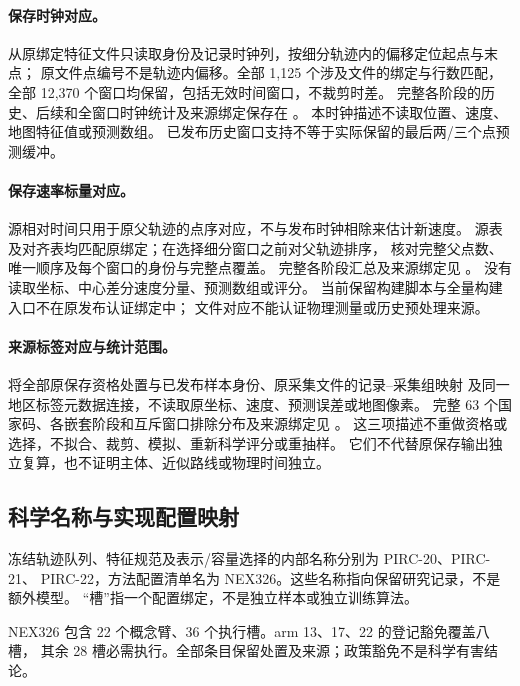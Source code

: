\documentclass[UTF8,11pt]{ctexart}
\begin{document}
\paragraph{保存时钟对应。}
从原绑定特征文件只读取身份及记录时钟列，按细分轨迹内的偏移定位起点与末点；
原文件点编号不是轨迹内偏移。全部 1,125 个涉及文件的绑定与行数匹配，
全部 12,370 个窗口均保留，包括无效时间窗口，不裁剪时差。
完整各阶段的历史、后续和全窗口时钟统计及来源绑定保存在
。
本时钟描述不读取位置、速度、地图特征值或预测数组。
已发布历史窗口支持不等于实际保留的最后两/三个点预测缓冲。

\paragraph{保存速率标量对应。}
源相对时间只用于原父轨迹的点序对应，不与发布时钟相除来估计新速度。
源表及对齐表均匹配原绑定；在选择细分窗口之前对父轨迹排序，
核对完整父点数、唯一顺序及每个窗口的身份与完整点覆盖。
完整各阶段汇总及来源绑定见
。
没有读取坐标、中心差分速度分量、预测数组或评分。
当前保留构建脚本与全量构建入口不在原发布认证绑定中；
文件对应不能认证物理测量或历史预处理来源。

\paragraph{来源标签对应与统计范围。}
将全部原保存资格处置与已发布样本身份、原采集文件的记录--采集组映射
及同一地区标签元数据连接，不读取原坐标、速度、预测误差或地图像素。
完整 63 个国家码、各嵌套阶段和互斥窗口排除分布及来源绑定见
。
这三项描述不重做资格或选择，不拟合、裁剪、模拟、重新科学评分或重抽样。
它们不代替原保存输出独立复算，也不证明主体、近似路线或物理时间独立。


\subsection{科学名称与实现配置映射}
\label{sec:method-implementation-map}
冻结轨迹队列、特征规范及表示/容量选择的内部名称分别为 PIRC-20、PIRC-21、
PIRC-22，方法配置清单名为 NEX326。这些名称指向保留研究记录，不是额外模型。
“槽”指一个配置绑定，不是独立样本或独立训练算法。

NEX326 包含 22 个概念臂、36 个执行槽。arm 13、17、22 的登记豁免覆盖八槽，
其余 28 槽必需执行。全部条目保留处置及来源；政策豁免不是科学有害结论。
\end{document}
